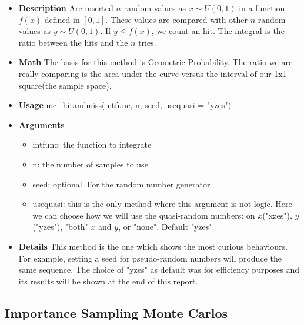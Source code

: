 \documentclass{article}
\begin{document}
\begin{itemize}
    \item \textbf{Description}\newline
    Are inserted $n$ random values as $x \sim U(0, 1)$ in a function $f(x)$ defined in $[0,1]$. These values are compared with other $n$ random values as $y \sim U(0, 1)$. If $y \leq f(x)$, we count an hit. The integral is the ratio between the hits and the $n$ tries.
    
    \item \textbf{Math}\newline
    The basis for this method is Geometric Probability. The ratio we are really comparing is the area under the curve versus the interval of our 1x1 square(the sample space).
    
    \item \textbf{Usage}\newline
    mc\_hitandmiss(intfunc, n, seed, usequasi = "yzes")
    
    \item \textbf{Arguments}
    \begin{itemize}
        \item intfunc:   the function to integrate
        \item n:         the number of samples to use
        \item seed:      optional. For the random number generator
        \item usequasi:  this is the only method where this argument is not logic. Here we can choose how we will use the quasi-random numbers: on $x$("xzes"), $y$("yzes"), "both" $x$ and $y$, or "none". Default "yzes".
    \end{itemize}
    \item \textbf{Details}\newline
    This method is the one which shows the most curious behaviours. For example, setting a seed for pseudo-random numbers will produce the same sequence. The choice of "yzes" as default was for efficiency purposes and its results will be shown at the end of this report.
\end{itemize}

\subsection{Importance Sampling Monte Carlos}
\end{document}
